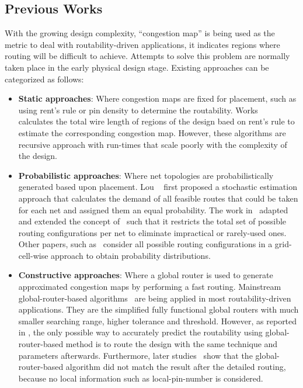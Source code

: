 \subsection{Previous Works}
With the growing design complexity, ``congestion map'' is being used as the metric to deal with routability-driven applications, it indicates regions where routing will be difficult to achieve. Attempts to solve this problem are normally taken place in the early physical design stage. Existing approaches can be categorized as follows:
\begin{itemize}
\item \textbf{Static approaches}: Where congestion maps are fixed for placement, such as using rent's rule or pin density to determine the routability. Works~\cite{rentsrule,rentsrulerecursive} calculates the total wire length of regions of the design baed on rent's rule to estimate the corresponding congestion map. However, these algorithms are recursive approach with run-times that scale poorly with the complexity of the design. 
\item \textbf{Probabilistic approaches}: Where net topologies are probabilistically generated based upon placement.  Lou \etal~\cite{first} first proposed a stochastic estimation approach that calculates the demand of all feasible routes that could be taken for each net and assigned them an equal probability. The work in~\cite{modeling} adapted and extended the concept of~\cite{first} such that it restricts the total set of possible routing configurations per net to eliminate impractical or rarely-used ones. Other papers, such as~\cite{SMD, 3step} consider all possible routing configurations in a grid-cell-wise approach to obtain probability distributions.
\item \textbf{Constructive approaches}: Where a global router is used to generate approximated congestion maps by performing a fast routing.  Mainstream global-router-based algorithms~\cite{mixedsizeplacement,ripple,simplr,nctufast,fastroute} are being applied in most routability-driven applications. They are the simplified fully functional global routers with much smaller searching range, higher tolerance and threshold. However, as reported in \cite{fastroute}, the only possible way to accurately predict the routability using global-router-based method is to route the design with the same technique and parameters afterwards. Furthermore, later studies~\cite{study,ispd14,ispd15} show that the global-router-based algorithm did not match the result after the detailed routing, because no local information such as local-pin-number is considered.

\end{itemize}
